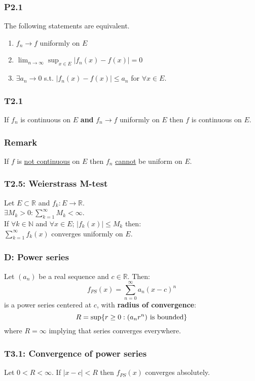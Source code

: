\documentclass{article}
\begin{document}
\begin{multicols*}{3}
\subsubsection*{P2.1}
The following statements are equivalent.
\begin{enumerate}
    \item $f_n\rightarrow f$ uniformly on $E$
    \item $\displaystyle\lim_{n\rightarrow\infty}
    \sup_{x\in E}|f_n(x)-f(x)|=0$
    \item $\exists a_n\rightarrow0$ s.t.
    $|f_n(x)-f(x)|\leq a_n$ for $\forall x\in E$.
\end{enumerate}

\subsubsection*{T2.1}
If $f_n$ is continuous on $E$ \textbf{and}
$f_n\rightarrow f$ uniformly on $E$
then $f$ is continuous on $E$.

\subsubsection*{Remark}
If $f$ is \underline{not continuous} on $E$
then $f_n$ \underline{cannot} be uniform on $E$.

\subsubsection*{T2.5: Weierstrass M-test}
Let $E\subset\mathbb{R}$ and
$f_k:E\rightarrow\mathbb{R}$. \\
$\exists M_k>0 : \displaystyle
\sum_{k=1}^{\infty}M_k<\infty$. \\
If $\forall k\in\mathbb{N}$
and $\forall x\in E$;
$|f_k(x)|\leq M_k$
then: \\
$\displaystyle\sum_{k=1}^{\infty}f_k(x)$
converges uniformly on $E$.

\subsubsection*{D: Power series}
Let $(a_n)$ be a real sequence and $c\in\mathbb{R}$. Then:
$$f_{PS}(x)=\sum_{n=0}^{\infty}a_n(x-c)^n$$
is a power series centered at $c$, with
\textbf{radius of convergence}:
$$R=\sup\{r\geq0:(a_n r^n)\hspace{0.05in}
\text{is bounded}\}$$
where $R=\infty$ implying that series converges
everywhere.

\subsubsection*{T3.1: Convergence of power series}
Let $0<R<\infty$.
If $|x-c|<R$ then
$f_{PS}(x)$ converges absolutely.


\end{multicols*}
\end{document}
